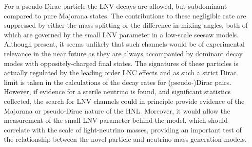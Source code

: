%
%
%
For a pseudo-Dirac particle the LNV decays are allowed, but subdominant compared to pure Majorana states.
The contributions to these negligible rate are suppressed by either the mass %
splitting or the difference in mixing angles, both of which are governed by the %
small LNV parameter in a low-scale seesaw models.
Although present, it seems unlikely that such channels would be of experimental relevance in %
the near future as they are always accompanied by dominant decay modes with oppositely-charged final states.
The signatures of these particles is actually regulated by the leading order LNC effects and %
as such a strict Dirac limit is taken in the calculations of the decay rates for \mbox{(pseudo-)Dirac} pairs.
However, if evidence for a sterile neutrino is found, and significant statistics collected, %
the search for LNV channels could in principle provide evidence of the Majorana or pseudo-Dirac nature of the HNL.
Moreover, it would allow the measurement of the small LNV parameter behind the model, %
which should correlate with the scale of light-neutrino masses, %
providing an important test of the relationship between the novel particle and neutrino mass generation models.

